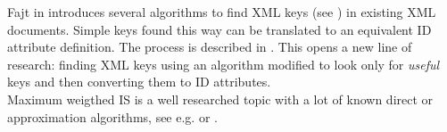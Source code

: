 Fajt in \cite{fajt} introduces several algorithms to find XML keys (see \cite{keX}) in existing XML documents. Simple keys found this way can be translated to an equivalent ID attribute definition. The process is described in \cite[Ch.\ 9, s.\ 3]{vlist2002xml}. This opens a new line of research: finding XML keys using an algorithm modified to look only for \textit{useful} keys and then converting them to ID attributes.\\

Maximum weigthed IS is a well researched topic with a lot of known direct or approximation algorithms, see e.g. \cite{JM1986425} or \cite{Fomin:2009:MCA:1552285.1552286}.\\